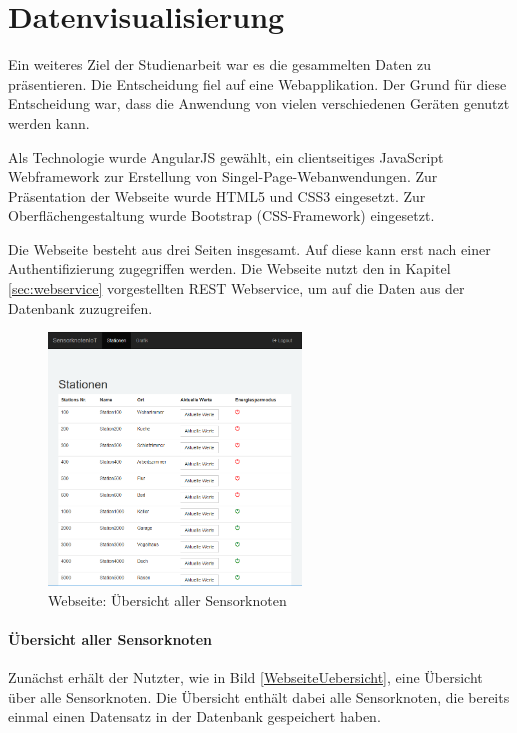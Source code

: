 \section{Datenvisualisierung}
\label{sec:Datenvisualiserung}
Ein weiteres Ziel der Studienarbeit war es die gesammelten Daten zu präsentieren. Die Entscheidung fiel auf eine Webapplikation. Der Grund für diese Entscheidung war, dass die Anwendung von vielen verschiedenen Geräten genutzt werden kann. 

Als Technologie wurde AngularJS gewählt, ein clientseitiges JavaScript Webframework zur Erstellung von Singel-Page-Webanwendungen. Zur Präsentation der Webseite wurde HTML5 und CSS3 eingesetzt. Zur Oberflächengestaltung wurde Bootstrap (CSS-Framework) eingesetzt.

Die Webseite besteht aus drei Seiten insgesamt. Auf diese kann erst nach einer Authentifizierung zugegriffen werden. Die Webseite nutzt den in Kapitel \ref{sec:webservice} vorgestellten REST Webservice, um auf die Daten aus der Datenbank zuzugreifen.
\begin{figure}
	\centering
	\includegraphics[width=0.6\textwidth]{bilder/WebseiteUebersicht}
	\caption{Webseite: Übersicht aller Sensorknoten}
	\label{img:WebseiteUebersicht}
\end{figure}

\paragraph{Übersicht aller Sensorknoten} Zunächst erhält der Nutzter, wie in Bild \ref{WebseiteUebersicht}, eine Übersicht über alle Sensorknoten. Die Übersicht enthält dabei alle Sensorknoten, die bereits einmal einen Datensatz in der Datenbank gespeichert haben.

